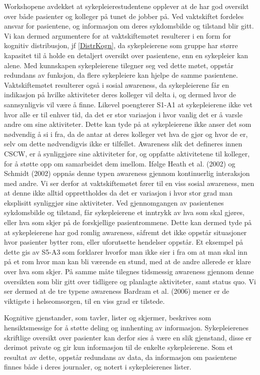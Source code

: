 Workshopene avdekket at sykepleierestudentene opplever at de har god oversikt over både pasienter og kolleger på tunet de jobber på. Ved vaktskiftet fordeles ansvar for pasientene, og informasjon om deres sykdomsbilde og tilstand blir gitt. Vi kan dermed argumentere for at vaktskiftemøtet resulterer i en form for kognitiv distribusjon, jf \ref{DistrKogn}, da sykepleierene som gruppe har større kapasitet til å holde en detaljert oversikt over pasientene, enn en sykepleier kan alene. Med kunnskapen sykepleierene tilegner seg ved dette møtet, oppstår redundans av funksjon, da flere sykepleiere kan hjelpe de samme pasientene. Vaktskiftemøtet resulterer også i sosial awareness, da sykepleierene får en indikasjon på hvilke aktiviteter deres kolleger vil delta i, og dermed hvor de sannsynligvis vil være å finne. Likevel poengterer S1-A1 at sykepleierene ikke vet hvor alle er til enhver tid, da det er stor variasjon i hvor vanlig det er å varsle andre om sine aktiviteter. Dette kan tyde på at sykepleierene ikke anser det som nødvendig å si i fra, da de antar at deres kolleger vet hva de gjør og hvor de er, selv om dette nødvendigvis ikke er tilfellet. Awareness slik det defineres innen CSCW, er å synliggjøre sine aktiviteter for, og oppfatte aktivitetene til kolleger, for å støtte opp om samarbeidet dem imellom. Ifølge Heath et al. (2002) og Schmidt (2002) oppnås denne typen awareness gjennom kontinuerlig interaksjon med andre. Vi ser derfor at vaktskiftemøtet fører til en viss sosial awareness, men at denne ikke alltid opprettholdes da det er variasjon i hvor stor grad man eksplisitt synliggjør sine aktiviteter. Ved gjennomgangen av pasientenes sykdomsbilde og tilstand, får sykepleierene et inntrykk av  hva som skal gjøres, eller hva som skjer på de forskjellige pasientrommene. Dette kan dermed tyde på at sykepleierene har god romlig awareness, såfremt det ikke oppstår situasjoner hvor pasienter bytter rom, eller uforutsette hendelser oppstår. Et eksempel på dette gis av S5-A3 som forklarer hvorfor man ikke sier i fra om at man skal inn på et rom hvor man kan bli værende en stund, med at de andre allerede er klare over hva som skjer. På samme måte tilegnes tidsmessig awareness gjennom denne oversikten som blir gitt over tidligere og planlagte aktiviteter, samt status quo. Vi ser dermed at de tre typene awareness Bardram et al. (2006) mener er de viktigste i helseomsorgen, til en viss grad er tilstede.

\noindent
Kognitive gjenstander, som tavler, lister og skjermer, beskrives som hensiktsmessige for å støtte deling og innhenting av informasjon. Sykepleierenes skriftlige oversikt over pasienter kan derfor sies å være en slik gjenstand, disse er derimot private og gir kun informasjon til de enkelte sykepleierene. Som et resultat av dette, oppstår redundans av data, da informasjon om pasientene finnes både i deres journaler, og notert i sykepleierenes lister. 

